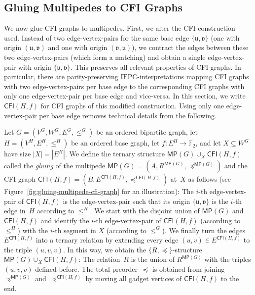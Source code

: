 \documentclass[]{lmcs}
\newcommand{\FF}{\mathbb{F}}
\newcommand{\defining}[1]{\emph{#1}}
\newcommand{\set}[1]{\lbrace #1 \rbrace}
\newcommand{\rel}{R}
\newcommand{\vertA}{u}
\newcommand{\vertB}{v}
\newcommand{\spleq}{\preceq}
\newcommand{\StructVA}{A}
\newcommand{\StructVB}{B}
\newcommand{\IFPC}{\ensuremath{\mathrm{IFPC}}}
\newcommand{\CFIsym}{\mathsf{CFI}}
\newcommand{\CFI}[1]{\CFIsym(#1)}
\newcommand{\bVertA}{\mathfrak{u}}
\newcommand{\bVertB}{\mathfrak{v}}
\newcommand{\multipede}[1]{\mathsf{MP}(#1)}
\newcommand{\gadgetsb}{V}
\newcommand{\feetb}{W}
\newcommand{\footbset}{X}
\newcommand{\gluing}[3]{#1 \cup_#2 #3}
\begin{document}
\subsection{Gluing Multipedes to CFI Graphs}

We now glue CFI graphs to multipedes.
First, we alter the CFI-construction used.
Instead of two edge-vertex-pairs for the same base edge $\set{\bVertA, \bVertB}$
(one with origin $(\bVertA,\bVertB)$ and one with origin $(\bVertB,\bVertA)$),
we contract the edges between these two edge-vertex-pairs (which form a matching)
and obtain a single edge-vertex-pair with origin $\set{\bVertA,\bVertB}$.
This preserves all relevant properties of CFI graphs.
In particular, there are parity-preserving \IFPC{}-interpretations
mapping CFI graphs with two edge-vertex-pairs per base edge to the corresponding CFI graphs  with only one edge-vertex-pair per base edge and vice-versa.
In this section, we write $\CFI{H,f}$ for CFI graphs of this modified construction.
Using only one edge-vertex-pair per base edge removes technical details from the following.

Let $G=(\gadgetsb^G,\feetb^G, E^G, \leq^G)$ be an ordered bipartite graph,
let $H=(V^H,E^H, \leq^H)$ be an ordered base graph,
let $f \colon E^H \to \FF_2$,
and let $\footbset \subseteq \feetb^G$ have size $|\footbset| = |E^H|$.
We define the ternary structure $\gluing{\multipede{G}}{\footbset}{\CFI{H, f}}$ called the \defining {gluing}
of the multipede $\multipede{G}  =  (\StructVA, R^{\multipede{G}}, \spleq^{\multipede{G}})$ and the CFI graph $\CFI{H, f}  = (\StructVB, E^{\CFI{H, f}}, \spleq^{\CFI{H, f}})$ at~$\footbset$ as follows (see Figure~\ref{fig:gluing-multipede-cfi-graph} for an illustration):
The $i$-th edge-vertex-pair of $\CFI{H, f}$ is the edge-vertex-pair such that its origin 
$\set{\bVertA,\bVertB}$ is the $i$-th edge in~$H$ according to $\leq^H$.
We start with the disjoint union of $\multipede{G}$ and $\CFI{H, f}$
and identify the $i$-th edge-vertex-pair of $\CFI{H, f}$ (according to $\leq^H$) with the $i$\nobreakdash-th segment in $\footbset$ (according to $\leq^G$).
We finally turn the edges $E^{\CFI{H, f}}$
into a ternary relation by extending every edge $(\vertA,\vertB)\in E^{\CFI{H, f}}$ to the triple $(\vertA,\vertB,\vertB)$.
In this way, we obtain the $\set{\rel,\spleq}$-structure $\gluing{\multipede{G}}{\footbset}{\CFI{H, f}}$:
The relation~$R$ is the union of $R^{\multipede{G}}$ with the triples $(\vertA,\vertB, \vertB)$ defined before.
The total preorder~$\spleq$ is obtained from joining~$\spleq^{\multipede{G}}$ and~$\spleq^{\CFI{H, f}}$
by moving all gadget vertices of $\CFI{H,f}$ to the end.
\end{document}
